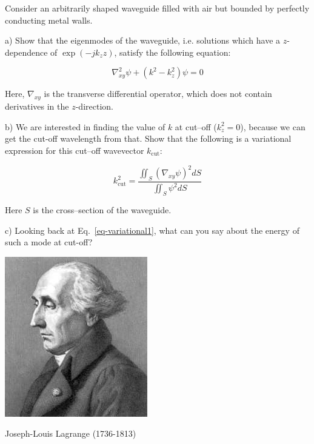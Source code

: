 \begin{exer}
  Consider an arbitrarily shaped waveguide filled with air but bounded by perfectly conducting metal walls.

  a) Show that the eigenmodes of the waveguide, i.e. solutions which have a $z$-dependence of $\exp{(-j k_z z)}$, satisfy the following equation:

$$ \nabla_{xy}^2 \psi + \left( k^2 - k_z^2 \right)\psi = 0 $$ 

Here, $\nabla_{xy}$ is the transverse differential operator, which does not contain derivatives in the $z$-direction.

\noindent{} b) We are interested in finding the value of $k$ at cut--off ($k_z^2=0$), because we can get the cut-off wavelength from that. Show that the following is a variational expression for this cut--off wavevector $k_{\mathrm{cut}}$:

$$ k_{\mathrm{cut}}^2 = \frac{\iint_S (\nabla_{xy} \psi)^2 dS}{\iint_S \psi^2 dS}$$

Here $S$ is the cross--section of the waveguide.

c) Looking back at Eq.~\ref{eq-variational1}, what can you say about the energy of such a mode at cut-off?

\end{exer}

\pagebreak



\begin{marginfigure}[1.0cm]
  \includegraphics{numeric/figures/j_lagrange}
  \caption{Joseph-Louis Lagrange (1736-1813)}
\end{marginfigure}


